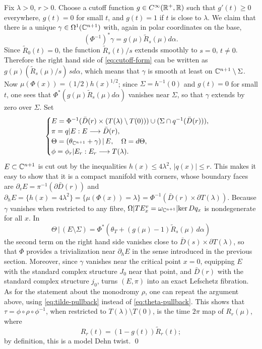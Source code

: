 \documentclass[10pt,letterpaper]{article}
\begin{document}
Fix $\lambda>0$, $r>0$. Choose a cutoff function $g \in C^\infty(\mathbb{R}^+,\mathbb{R})$ such
that $g'(t) \geq 0$ everywhere, $g(t) = 0$ for small $t$, and $g(t) = 1$ if $t$
is close to $\lambda$. We claim that there is a unique $\gamma \in
\Omega^1(\mathbb{C}^{n+1})$ with, again in polar coordinates on the base,
\begin{equation} \label{eq:cutoff-form}
(\Phi^{-1})^*\gamma = g(\mu)\tilde{R}_s(\mu) d\alpha.
\end{equation}
Since $\tilde{R}_0(t) = 0$, the function $\tilde{R}_s(t)/s$ extends smoothly to
$s = 0$, $t \neq 0$. Therefore the right hand side of \eqref{eq:cutoff-form}
can be written as $g(\mu)(\tilde{R}_s(\mu)/s)\, s d\alpha$, which means that
$\gamma$ is smooth at least on $\mathbb{C}^{n+1} \setminus \Sigma$. Now $\mu(\Phi(x)) =
(1/2) h(x)^{1/2}$; since $\Sigma = h^{-1}(0)$ and $g(t) = 0$ for small $t$, one
sees that $\Phi^*(g(\mu)\tilde{R}_s(\mu)d\alpha)$ vanishes near $\Sigma$, so
that $\gamma$ extends by zero over $\Sigma$. Set
\begin{equation} \label{eq:define-model}
\begin{cases}
 E = \Phi^{-1}(\bar{D}(r) \times (T(\lambda) \setminus T(0)))
 \cup (\Sigma \cap q^{-1}(\bar{D}(r))), \\
 \pi = q|E: E \longrightarrow \bar{D}(r), \\
 \Theta = (\theta_{\mathbb{C}^{n+1}} + \gamma) \,|\,E, \quad
 \Omega = d\Theta, \\
 \phi = \phi_r|E_r: E_r \longrightarrow T(\lambda).
\end{cases}
\end{equation}
$E \subset \mathbb{C}^{n+1}$ is cut out by the inequalities $h(x) \leq 4\lambda^2$,
$|q(x)| \leq r$. This makes it easy to show that it is a compact manifold with
corners, whose boundary faces are $\partial_vE = \pi^{-1}(\partial \bar{D}(r))$
and $\partial_hE = \{h(x) = 4\lambda^2\} = \{\mu(\Phi(x)) = \lambda\} =
\Phi^{-1}(\bar{D}(r) \times \partial T(\lambda))$. Because $\gamma$ vanishes
when restricted to any fibre, $\Omega|TE^v_x = \omega_{\mathbb{C}^{n+1}} | \mathrm{ker}\, Dq_x$ is
nondegenerate for all $x$. In
\begin{equation} \label{eq:tilde-pullback}
\Theta\,|\,(E \setminus \Sigma) = \Phi^*(\theta_T + (g(\mu)-1)
\tilde{R}_s(\mu)\, d\alpha)
\end{equation}
the second term on the right hand side vanishes close to $\bar{D}(s) \times
\partial T(\lambda)$, so that $\Phi$ provides a trivialization near
$\partial_hE$ in the sense introduced in the previous section. Moreover, since
$\gamma$ vanishes near the critical point $x = 0$, equipping $E$ with the
standard complex structure $J_0$ near that point, and $\bar{D}(r)$ with the
standard complex structure $j_0$, turns $(E,\pi)$ into an exact Lefschetz
fibration. As for the statement about the monodromy $\rho$, one can repeat the
argument above, using \eqref{eq:tilde-pullback} instead of
\eqref{eq:theta-pullback}. This shows that $\tau = \phi \circ \rho \circ
\phi^{-1}$, when restricted to $T(\lambda) \setminus T(0)$, is the time $2\pi$
map of $R_r(\mu)$, where
\begin{equation} \label{eq:r-function}
R_r(t) = (1-g(t))\tilde{R}_r(t);
\end{equation}
by definition, this is a model Dehn twist. \qed
\end{document}
